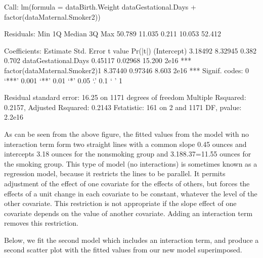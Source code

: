 \documentclass[letterpaper,10pt,english]{jupyterBook}
\begin{document}
\begin{sphinxVerbatim}[commandchars=\\\{\}]
Call:
lm(formula = data\PYGZdl{}Birth.Weight \PYGZti{} data\PYGZdl{}Gestational.Days + factor(data\PYGZdl{}Maternal.Smoker2))

Residuals:
    Min      1Q  Median      3Q     Max 
\PYGZhy{}50.789 \PYGZhy{}11.035  \PYGZhy{}0.211  10.053  52.412 

Coefficients:
                               Estimate Std. Error t value Pr(\PYGZgt{}|t|)    
(Intercept)                    \PYGZhy{}3.18492    8.32945  \PYGZhy{}0.382    0.702    
data\PYGZdl{}Gestational.Days           0.45117    0.02968  15.200   \PYGZlt{}2e\PYGZhy{}16 ***
factor(data\PYGZdl{}Maternal.Smoker2)1 \PYGZhy{}8.37440    0.97346  \PYGZhy{}8.603   \PYGZlt{}2e\PYGZhy{}16 ***
\PYGZhy{}\PYGZhy{}\PYGZhy{}
Signif. codes:  0 ‘***’ 0.001 ‘**’ 0.01 ‘*’ 0.05 ‘.’ 0.1 ‘ ’ 1

Residual standard error: 16.25 on 1171 degrees of freedom
Multiple R\PYGZhy{}squared:  0.2157,	Adjusted R\PYGZhy{}squared:  0.2143 
F\PYGZhy{}statistic:   161 on 2 and 1171 DF,  p\PYGZhy{}value: \PYGZlt{} 2.2e\PYGZhy{}16
\end{sphinxVerbatim}

\noindent{}

\sphinxAtStartPar
As can be seen from the above figure, the fitted values from the model with no interaction term form two straight lines with a common slope 0.45 ounces and intercepts \sphinxhyphen{}3.18 ounces for the non\sphinxhyphen{}smoking group and \sphinxhyphen{}3.18\sphinxhyphen{}8.37=\sphinxhyphen{}11.55 ounces for the smoking group. This type of model (no interactions) is sometimes known as a  regression model, because it restricts the lines to be parallel. It permits adjustment of the effect of one covariate for the effects of others, but forces the effects of a unit change in each covariate to be constant, whatever the level of the other covariate. This restriction is not appropriate if the slope effect of one covariate depends on the value of another covariate. Adding an interaction term removes this restriction.

\sphinxAtStartPar
Below, we fit the second model which includes an interaction term, and produce a second scatter plot with the fitted values from our new model superimposed.
\end{document}

